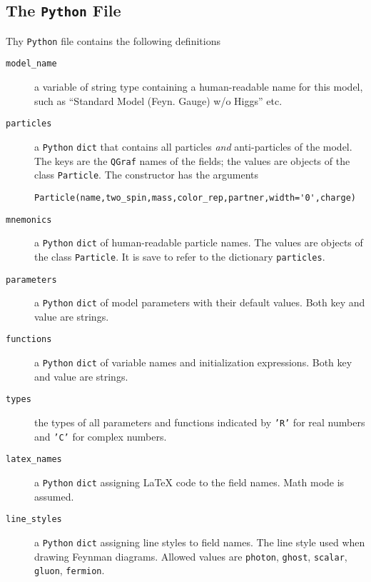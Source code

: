 \documentclass[11pt,a4paper]{refrep}
\newcommand{\qgraf}{{\tt QGraf}\xspace}
\newcommand{\python}{{\tt Python}\xspace}
\begin{document}
\subsection{The \python{} File}
Thy \python{} file contains the following definitions
\begin{description}
\item[\texttt{model\_name}] a variable of string type containing a human-readable
     name for this model, such as ``Standard Model (Feyn. Gauge) w/o Higgs'' etc.
\item[\texttt{particles}] a \python{} \texttt{dict} that contains all particles
     \emph{and} anti-particles of the model. The keys are the \qgraf{} names of the
     fields; the values are objects of the class \texttt{Particle}.
     The constructor has the arguments
     \begin{verbatim}
Particle(name,two_spin,mass,color_rep,partner,width='0',charge)
     \end{verbatim}
\item[\texttt{mnemonics}] a \python{} \texttt{dict} of
     human-readable particle names. The values are objects of the class
     \texttt{Particle}. It is save to refer to the dictionary \texttt{particles}.
\item[\texttt{parameters}] a \python{} \texttt{dict} of
     model parameters with their default values. Both key and value are strings.
\item[\texttt{functions}] a \python{} \texttt{dict} of
     variable names and initialization expressions. Both key and value are strings.
\item[\texttt{types}] the types of all parameters and functions indicated by
     \texttt{'R'} for real numbers and \texttt{'C'} for complex numbers.
\item[\texttt{latex\_names}] a \python{} \texttt{dict} assigning \LaTeX{}
     code to the field names. Math mode is assumed.
\item[\texttt{line\_styles}] a \python{} \texttt{dict} assigning line styles
     to field names. The line style used when drawing Feynman diagrams.
     Allowed values are \texttt{photon}, \texttt{ghost}, \texttt{scalar},
     \texttt{gluon}, \texttt{fermion}.
\end{description}
\end{document}

